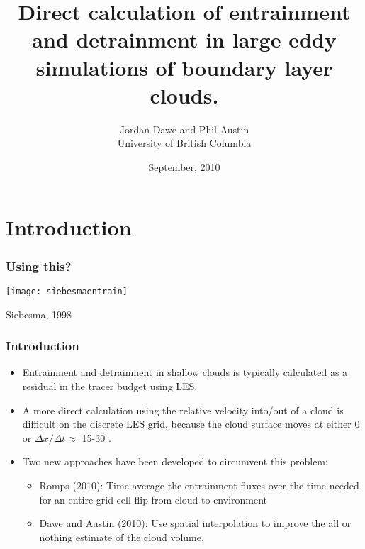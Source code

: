 \documentclass[fleqn,hyperref={colorlinks=true,linkcolor=blue,urlcolor=blue},numbers]{beamer}
\begin{document}
\author{Jordan Dawe and Phil Austin\\
University of British Columbia} 
\title{Direct calculation of entrainment and detrainment in 
large eddy simulations
of boundary layer clouds.}
\date{September, 2010} 



\frame{\titlepage
} 


\section{Introduction}


\begin{frame}
  \frametitle{Using this?}
\texttt{[image: siebesmaentrain]}
\par
\small
Siebesma, 1998
\normalsize
\end{frame}




\begin{frame}
  \frametitle{Introduction}

  \begin{itemize}

  \item Entrainment and detrainment in shallow clouds is  typically calculated as a
residual in the tracer budget using LES. \pause

\item A more direct calculation using the relative velocity into/out of a cloud
is difficult on the discrete LES grid, because
the cloud surface moves at either 0 or $\Delta x/\Delta t \approx $ 15-30 . \pause

\item Two new approaches have been developed to circumvent this problem:  \pause

  \begin{itemize}
  \item Romps (2010):  Time-average the entrainment fluxes over the time needed for an entire
grid cell flip from cloud to environment \pause
\item Dawe and Austin (2010):  Use spatial interpolation to improve the all or nothing estimate
of the cloud volume.
  \end{itemize}

     
  \end{itemize}
\end{frame}
\end{document}
